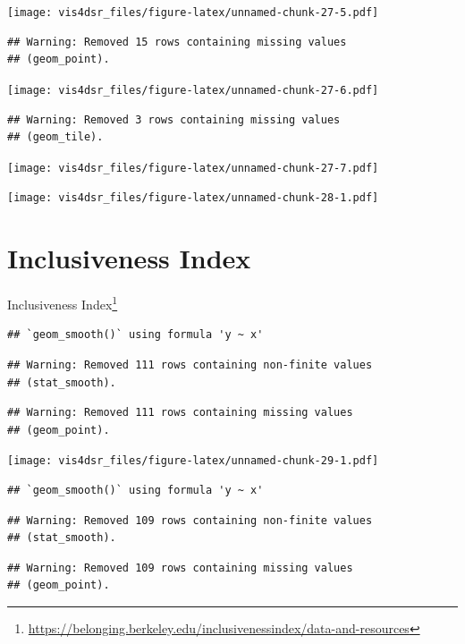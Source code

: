 \documentclass[
]{krantz}
\renewcommand{\href}[2]{#2\footnote{\url{#1}}}
\begin{document}
\texttt{[image: vis4dsr\_files/figure-latex/unnamed-chunk-27-5.pdf]}

\begin{verbatim}
## Warning: Removed 15 rows containing missing values
## (geom_point).
\end{verbatim}

\texttt{[image: vis4dsr\_files/figure-latex/unnamed-chunk-27-6.pdf]}

\begin{verbatim}
## Warning: Removed 3 rows containing missing values
## (geom_tile).
\end{verbatim}

\texttt{[image: vis4dsr\_files/figure-latex/unnamed-chunk-27-7.pdf]}

\texttt{[image: vis4dsr\_files/figure-latex/unnamed-chunk-28-1.pdf]}

\hypertarget{inclusiveness-index}{%
\section*{Inclusiveness Index}\label{inclusiveness-index}}


\href{https://belonging.berkeley.edu/inclusivenessindex/data-and-resources}{Inclusiveness Index}

\begin{verbatim}
## `geom_smooth()` using formula 'y ~ x'
\end{verbatim}

\begin{verbatim}
## Warning: Removed 111 rows containing non-finite values
## (stat_smooth).
\end{verbatim}

\begin{verbatim}
## Warning: Removed 111 rows containing missing values
## (geom_point).
\end{verbatim}

\texttt{[image: vis4dsr\_files/figure-latex/unnamed-chunk-29-1.pdf]}

\begin{verbatim}
## `geom_smooth()` using formula 'y ~ x'
\end{verbatim}

\begin{verbatim}
## Warning: Removed 109 rows containing non-finite values
## (stat_smooth).
\end{verbatim}

\begin{verbatim}
## Warning: Removed 109 rows containing missing values
## (geom_point).
\end{verbatim}
\end{document}
